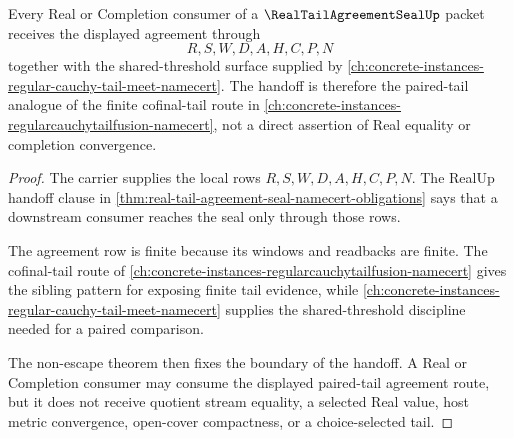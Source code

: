 \begin{theorem}
\label{thm:real-tail-agreement-seal-real-classifier-handoff}
Every Real or Completion consumer of a $\RealTailAgreementSealUp$ packet receives the displayed agreement through
$$
R,S,W,D,A,H,C,P,N
$$
together with the shared-threshold surface supplied by \autoref{ch:concrete-instances-regular-cauchy-tail-meet-namecert}. The handoff is therefore the paired-tail analogue of the finite cofinal-tail route in \autoref{ch:concrete-instances-regularcauchytailfusion-namecert}, not a direct assertion of Real equality or completion convergence.
\end{theorem}
\begin{proof}
The carrier supplies the local rows $R,S,W,D,A,H,C,P,N$. The RealUp handoff clause in \autoref{thm:real-tail-agreement-seal-namecert-obligations} says that a downstream consumer reaches the seal only through those rows.

The agreement row is finite because its windows and readbacks are finite. The cofinal-tail route of \autoref{ch:concrete-instances-regularcauchytailfusion-namecert} gives the sibling pattern for exposing finite tail evidence, while \autoref{ch:concrete-instances-regular-cauchy-tail-meet-namecert} supplies the shared-threshold discipline needed for a paired comparison.

The non-escape theorem then fixes the boundary of the handoff. A Real or Completion consumer may consume the displayed paired-tail agreement route, but it does not receive quotient stream equality, a selected Real value, host metric convergence, open-cover compactness, or a choice-selected tail.
\end{proof}

